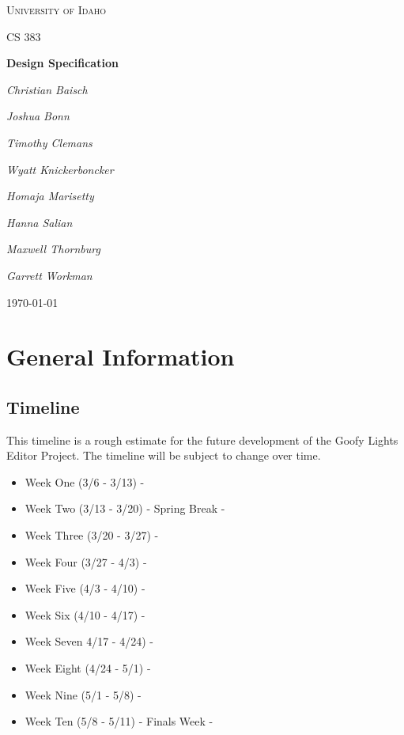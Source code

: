 \documentclass[12pt, oneside]{article}
\begin{document}
\begin{titlepage}
\centering
	{\scshape\LARGE University of Idaho \par}
	\vspace{1cm}
	{\scshape\Large CS 383\par}
	\vspace{1.5cm}
	{\huge\bfseries Design Specification\par}
	\vspace{2cm}
	{\Large\itshape Christian Baisch\par}
	{\Large\itshape Joshua Bonn\par}
	{\Large\itshape Timothy Clemans\par}
	{\Large\itshape Wyatt Knickerboncker\par}
	{\Large\itshape Homaja Marisetty\par}
	{\Large\itshape Hanna Salian\par}
	{\Large\itshape Maxwell Thornburg\par}
	{\Large\itshape Garrett Workman\par}
	\vfill
	{\large \today\par}
\end{titlepage}

\section{General Information}

\subsection{Timeline}

This timeline is a rough estimate for the future development of the Goofy Lights Editor Project. 
The timeline will be subject to change over time.

\begin{itemize}
\item
Week One (3/6 - 3/13) - 
\item
Week Two (3/13 - 3/20) - Spring Break - 
\item
Week Three (3/20 - 3/27) -  
\item
Week Four (3/27 - 4/3) -
\item
Week Five (4/3 - 4/10) -
\item
Week Six (4/10 - 4/17) -
\item
Week Seven 4/17 - 4/24) -
\item
Week Eight (4/24 - 5/1) - 
\item
Week Nine (5/1 - 5/8) - 
\item
Week Ten  (5/8 - 5/11) - Finals Week - 


\end{itemize}
\end{document}
